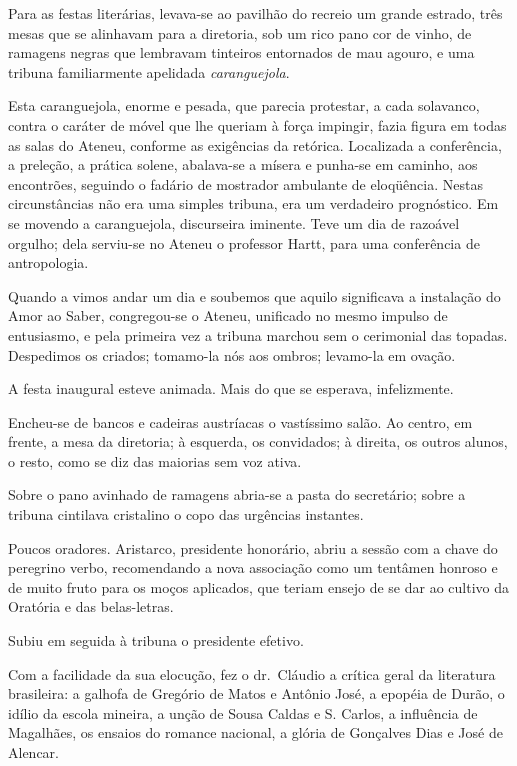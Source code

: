 Para as festas literárias, levava{}-se ao pavilhão do recreio um grande
estrado, três mesas que se alinhavam para a diretoria, sob um rico pano
cor de vinho, de ramagens negras que lembravam tinteiros entornados de
mau agouro, e uma tribuna familiarmente apelidada \textit{caranguejola}. 

Esta caranguejola, enorme e pesada, que parecia protestar, a cada solavanco,
contra o caráter de móvel que lhe queriam à força impingir, fazia
figura em todas as salas do Ateneu, conforme as exigências da retórica.
Localizada a conferência, a preleção, a prática solene, abalava{}-se a
mísera e punha{}-se em caminho, aos encontrões, seguindo o fadário de
mostrador ambulante de eloqüência. Nestas circunstâncias não era uma
simples tribuna, era um verdadeiro prognóstico. Em se movendo a
caranguejola, discurseira iminente. Teve um dia de razoável orgulho;
dela serviu{}-se no Ateneu o professor Hartt, para uma conferência de
antropologia. 

Quando a vimos andar um dia e soubemos que aquilo
significava a instalação do Amor ao Saber, congregou{}-se o Ateneu,
unificado no mesmo impulso de entusiasmo, e pela primeira vez a tribuna
marchou sem o cerimonial das topadas. Despedimos os criados;
tomamo{}-la nós aos ombros; levamo{}-la em ovação. 

A festa inaugural
esteve animada. Mais do que se esperava, infelizmente. 

Encheu{}-se de
bancos e cadeiras austríacas o vastíssimo salão. Ao centro, em frente,
a mesa da diretoria; à esquerda, os convidados; à direita, os outros
alunos, o resto, como se diz das maiorias sem voz ativa. 

Sobre o pano
avinhado de ramagens abria{}-se a pasta do secretário; sobre a tribuna
cintilava cristalino o copo das urgências instantes. 

Poucos oradores.
Aristarco, presidente honorário, abriu a sessão com a chave do
peregrino verbo, recomendando a nova associação como um tentâmen
honroso e de muito fruto para os moços aplicados, que teriam ensejo de
se dar ao cultivo da Oratória e das belas{}-letras. 

Subiu em seguida à
tribuna o presidente efetivo. 

Com a facilidade da sua elocução, fez o
dr.~Cláudio a crítica geral da literatura brasileira: a galhofa de
Gregório de Matos e Antônio José, a epopéia de Durão, o idílio da
escola mineira, a unção de Sousa Caldas e S. Carlos, a influência de
Magalhães, os ensaios do romance nacional, a glória de Gonçalves Dias e
José de Alencar. 

